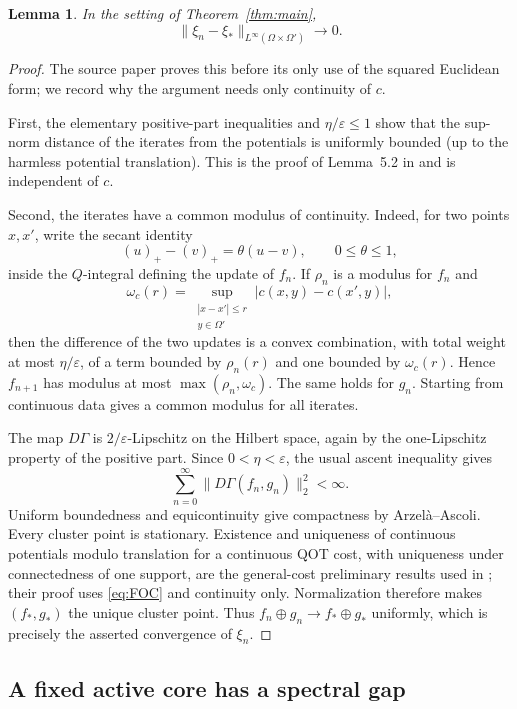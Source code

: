 \documentclass[11pt]{article}
\newtheorem{lemma}[theorem]{Lemma}
\newcommand{\eps}{\varepsilon}
\newcommand{\1}{\mathbf{1}}
\begin{document}
\begin{lemma}
\label{lem:preconvergence}
In the setting of Theorem~\ref{thm:main},
\[
 \|\xi_n-\xi_*\|_{L^\infty(\Omega\times\Omega')}\longrightarrow0.
\]
\end{lemma}

\begin{proof}
The source paper proves this before its only use of the squared Euclidean
form; we record why the argument needs only continuity of $c$.

First, the elementary positive-part inequalities and $\eta/\eps\le1$ show
that the sup-norm distance of the iterates from the potentials is uniformly
bounded (up to the harmless potential translation).  This is the proof of
Lemma~5.2 in \cite{GNR2026} and is independent of $c$.

Second, the iterates have a common modulus of continuity.  Indeed, for two
points $x,x'$, write the secant identity
\[
 (u)_+-(v)_+=\theta(u-v),\qquad 0\le\theta\le1,
\]
inside the $Q$-integral defining the update of $f_n$.  If $\rho_n$ is a
modulus for $f_n$ and
\[
 \omega_c(r)=\sup_{\substack{|x-x'|\le r\\y\in\Omega'}}
              |c(x,y)-c(x',y)|,
\]
then the difference of the two updates is a convex combination, with total
weight at most $\eta/\eps$, of a term bounded by $\rho_n(r)$ and one bounded
by $\omega_c(r)$.  Hence $f_{n+1}$ has modulus at most
$\max(\rho_n,\omega_c)$.  The same holds for $g_n$.  Starting from continuous
data gives a common modulus for all iterates.

The map $D\Gamma$ is $2/\eps$-Lipschitz on the Hilbert space, again by the
one-Lipschitz property of the positive part.  Since $0<\eta<\eps$, the usual
ascent inequality gives
\[
 \sum_{n=0}^\infty\|D\Gamma(f_n,g_n)\|_2^2<\infty.
\]
Uniform boundedness and equicontinuity give compactness by Arzel\`a--Ascoli.
Every cluster point is stationary.  Existence and uniqueness of continuous
potentials modulo translation for a continuous QOT cost, with uniqueness
under connectedness of one support, are the general-cost preliminary results
used in \cite{GNR2026}; their proof uses \eqref{eq:FOC} and continuity only.
Normalization therefore makes $(f_*,g_*)$ the unique cluster point.  Thus
$f_n\oplus g_n\to f_*\oplus g_*$ uniformly, which is precisely the asserted
convergence of $\xi_n$.
\end{proof}

\subsection{A fixed active core has a spectral gap}
\end{document}
